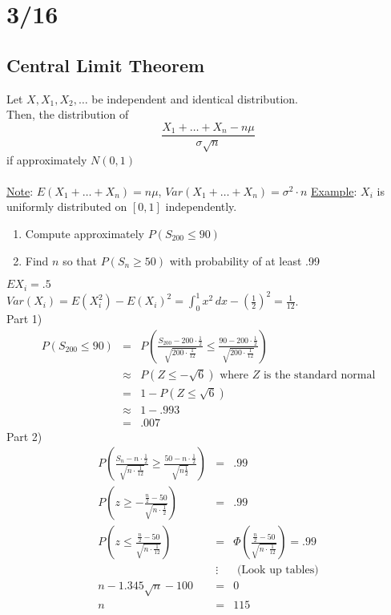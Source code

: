 \section*{3/16}
  \subsection*{Central Limit Theorem}
    Let $X, X_1, X_2, \ldots$ be independent and identical distribution.\\
    Then, the distribution of
    $$
      \frac{X_1 + \ldots + X_n - n\mu}{\sigma\sqrt{n}}
    $$
    if approximately $N(0,1)$\\\\
  \underline{Note}: $E(X_1 + \ldots + X_n) = n\mu$, $Var(X_1 + \ldots + X_n) =
  \sigma^2 \cdot n$
  \underline{Example}: $X_i$ is uniformly distributed on $[0,1]$ 
  independently.\\
  \begin{enumerate}
    \item Compute approximately $P(S_{200} \le 90)$
    \item Find $n$ so that $P(S_n \ge 50)$ with probability of at least .99
  \end{enumerate}
  $EX_i = .5$\\
  $Var(X_i) = E(X_i^2) - E(X_i)^2 = \int_0^1 x^2\,dx - \left(\frac{1}{2}
  \right)^2 = \frac{1}{12}$.\\
  Part 1) 
  \begin{eqnarray*}
    P(S_{200} \le 90) & = & P\left(\frac{S_{200} - 200 \cdot \frac{1}{2}}{
    \sqrt{200 \cdot \frac{1}{12}}} \le \frac{90 - 200 \cdot \frac{1}{2}}{
    \sqrt{200 \cdot \frac{1}{12}}}\right)\\
    & \approx & P(Z \le -\sqrt{6}) \text{ where $Z$ is the standard normal}\\
    & = & 1 - P(Z \le \sqrt{6})\\
    & \approx & 1 - .993\\
    & = & .007
  \end{eqnarray*}
  Part 2)
  \begin{eqnarray*}
    P\left(\frac{S_n - n \cdot \frac{1}{2}}{\sqrt{n \cdot \frac{1}{12}}}
      \ge \frac{50 - n\cdot \frac{1}{2}}{\sqrt{n \frac{1}{2}}}\right)
    & = & .99\\
    P\left(z \ge - \frac{\frac{n}{2} - 50}{\sqrt{n \cdot \frac{1}{2}}}\right)
    & = & .99\\
    P\left(z \le \frac{\frac{n}{2} - 50}{\sqrt{n \cdot \frac{1}{12}}}\right) & = &
    \Phi\left(\frac{\frac{n}{2} - 50}{\sqrt{n \cdot \frac{1}{12}}}\right) = .99\\
    & \vdots & \text{              (Look up tables)}\\
    n - 1.345\sqrt{n} - 100 &=& 0\\
    n & = & 115
  \end{eqnarray*}
